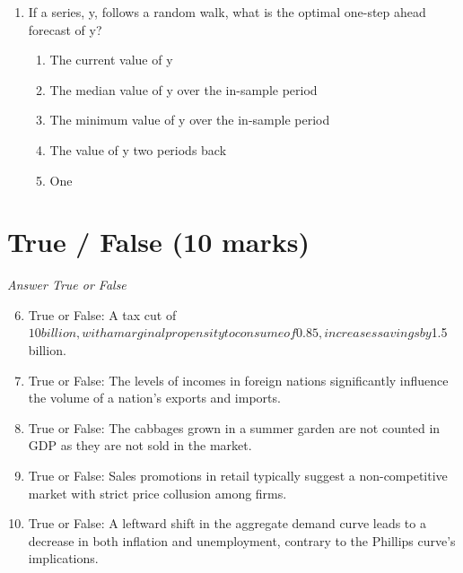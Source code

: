 \documentclass[12pt]{article}
\begin{document}
\begin{enumerate}[label=\arabic*.]
\begin{enumerate}[label=(\alph*)]
    \item a decrease in the money supply.
    \item an increase in consumer confidence.
    \item a sudden surge in technological innovation.
    \item a prolonged period of very bad weather.
    \item a decrease in consumer confidence.
\end{enumerate}
\item If a series, y, follows a random walk, what is the optimal one-step ahead forecast of y?
\begin{enumerate}[label=(\alph*)]
    \item The current value of y
    \item The median value of y over the in-sample period
    \item The minimum value of y over the in-sample period
    \item The value of y two periods back
    \item One
\end{enumerate}
\end{enumerate}

\section*{True / False (10 marks)}
\textit{Answer True or False}
\begin{enumerate}[label=\arabic*.]
\setcounter{enumi}{5}
\item True or False: A tax cut of $10 billion, with a marginal propensity to consume of 0.85, increases savings by $1.5 billion.
\item True or False: The levels of incomes in foreign nations significantly influence the volume of a nation's exports and imports.
\item True or False: The cabbages grown in a summer garden are not counted in GDP as they are not sold in the market.
\item True or False: Sales promotions in retail typically suggest a non-competitive market with strict price collusion among firms.
\item True or False: A leftward shift in the aggregate demand curve leads to a decrease in both inflation and unemployment, contrary to the Phillips curve's implications.
\end{enumerate}
\end{document}
